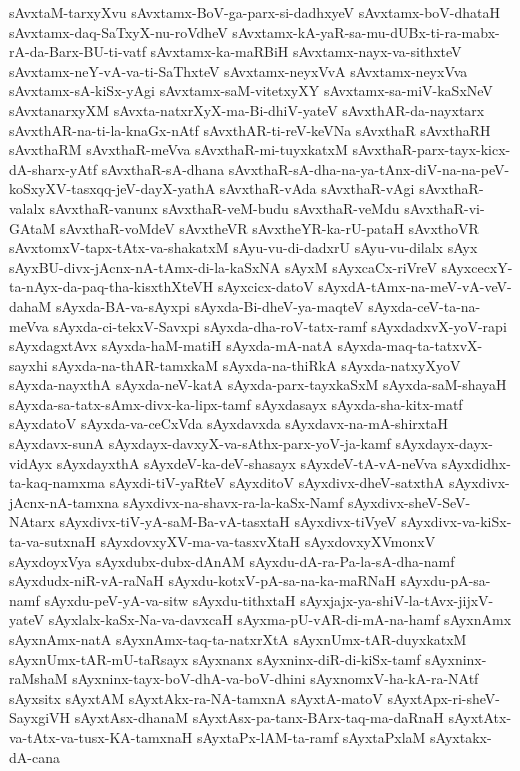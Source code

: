 {sAvxtaM-tarxyXvu
sAvxtamx-BoV-ga-parx-si-dadhxyeV
sAvxtamx-boV-dhataH
sAvxtamx-daq-SaTxyX-nu-roVdheV
sAvxtamx-kA-yaR-sa-mu-dUBx-ti-ra-mabx-rA-da-Barx-BU-ti-vatf
sAvxtamx-ka-maRBiH
sAvxtamx-nayx-va-sithxteV
sAvxtamx-neY-vA-va-ti-SaThxteV
sAvxtamx-neyxVvA
sAvxtamx-neyxVva
sAvxtamx-sA-kiSx-yAgi
sAvxtamx-saM-vitetxyXY
sAvxtamx-sa-miV-kaSxNeV
sAvxtanarxyXM
sAvxta-natxrXyX-ma-Bi-dhiV-yateV
sAvxthAR-da-nayxtarx
sAvxthAR-na-ti-la-knaGx-nAtf
sAvxthAR-ti-reV-keVNa
sAvxthaR
sAvxthaRH
sAvxthaRM
sAvxthaR-meVva
sAvxthaR-mi-tuyxkatxM
sAvxthaR-parx-tayx-kicx-dA-sharx-yAtf
sAvxthaR-sA-dhana
sAvxthaR-sA-dha-na-ya-tAnx-diV-na-na-peV-koSxyXV-tasxqq-jeV-dayX-yathA
sAvxthaR-vAda
sAvxthaR-vAgi
sAvxthaR-valalx
sAvxthaR-vanunx
sAvxthaR-veM-budu
sAvxthaR-veMdu
sAvxthaR-vi-GAtaM
sAvxthaR-voMdeV
sAvxtheVR
sAvxtheYR-ka-rU-pataH
sAvxthoVR
sAvxtomxV-tapx-tAtx-va-shakatxM
sAyu-vu-di-dadxrU
sAyu-vu-dilalx
sAyx
sAyxBU-divx-jAcnx-nA-tAmx-di-la-kaSxNA
sAyxM
sAyxcaCx-riVreV
sAyxcecxY-ta-nAyx-da-paq-tha-kisxthXteVH
sAyxcicx-datoV
sAyxdA-tAmx-na-meV-vA-veV-dahaM
sAyxda-BA-va-sAyxpi
sAyxda-Bi-dheV-ya-maqteV
sAyxda-ceV-ta-na-meVva
sAyxda-ci-tekxV-Savxpi
sAyxda-dha-roV-tatx-ramf
sAyxdadxvX-yoV-rapi
sAyxdagxtAvx
sAyxda-haM-matiH
sAyxda-mA-natA
sAyxda-maq-ta-tatxvX-sayxhi
sAyxda-na-thAR-tamxkaM
sAyxda-na-thiRkA
sAyxda-natxyXyoV
sAyxda-nayxthA
sAyxda-neV-katA
sAyxda-parx-tayxkaSxM
sAyxda-saM-shayaH
sAyxda-sa-tatx-sAmx-divx-ka-lipx-tamf
sAyxdasayx
sAyxda-sha-kitx-matf
sAyxdatoV
sAyxda-va-ceCxVda
sAyxdavxda
sAyxdavx-na-mA-shirxtaH
sAyxdavx-sunA
sAyxdayx-davxyX-va-sAthx-parx-yoV-ja-kamf
sAyxdayx-dayx-vidAyx
sAyxdayxthA
sAyxdeV-ka-deV-shasayx
sAyxdeV-tA-vA-neVva
sAyxdidhx-ta-kaq-namxma
sAyxdi-tiV-yaRteV
sAyxditoV
sAyxdivx-dheV-satxthA
sAyxdivx-jAcnx-nA-tamxna
sAyxdivx-na-shavx-ra-la-kaSx-Namf
sAyxdivx-sheV-SeV-NAtarx
sAyxdivx-tiV-yA-saM-Ba-vA-tasxtaH
sAyxdivx-tiVyeV
sAyxdivx-va-kiSx-ta-va-sutxnaH
sAyxdovxyXV-ma-va-tasxvXtaH
sAyxdovxyXVmonxV
sAyxdoyxVya
sAyxdubx-dubx-dAnAM
sAyxdu-dA-ra-Pa-la-sA-dha-namf
sAyxdudx-niR-vA-raNaH
sAyxdu-kotxV-pA-sa-na-ka-maRNaH
sAyxdu-pA-sa-namf
sAyxdu-peV-yA-va-sitw
sAyxdu-tithxtaH
sAyxjajx-ya-shiV-la-tAvx-jijxV-yateV
sAyxlalx-kaSx-Na-va-davxcaH
sAyxma-pU-vAR-di-mA-na-hamf
sAyxnAmx
sAyxnAmx-natA
sAyxnAmx-taq-ta-natxrXtA
sAyxnUmx-tAR-duyxkatxM
sAyxnUmx-tAR-mU-taRsayx
sAyxnanx
sAyxninx-diR-di-kiSx-tamf
sAyxninx-raMshaM
sAyxninx-tayx-boV-dhA-va-boV-dhini
sAyxnomxV-ha-kA-ra-NAtf
sAyxsitx
sAyxtAM
sAyxtAkx-ra-NA-tamxnA
sAyxtA-matoV
sAyxtApx-ri-sheV-SayxgiVH
sAyxtAsx-dhanaM
sAyxtAsx-pa-tanx-BArx-taq-ma-daRnaH
sAyxtAtx-va-tAtx-va-tusx-KA-tamxnaH
sAyxtaPx-lAM-ta-ramf
sAyxtaPxlaM
sAyxtakx-dA-cana
}
